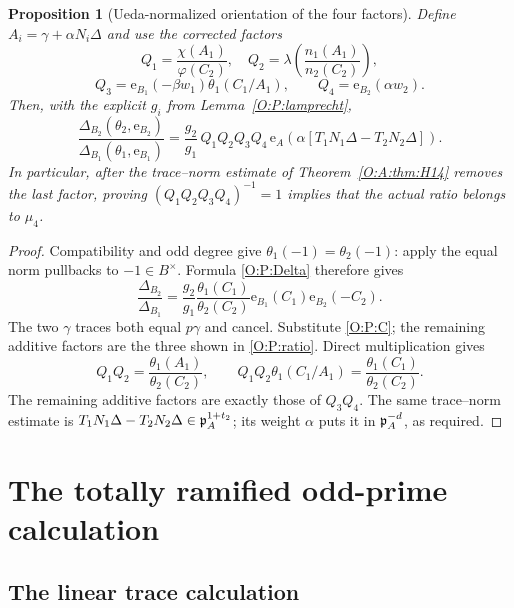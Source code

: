 \documentclass[11pt]{amsart}
\newtheorem{proposition}[theorem]{Proposition}
\theoremstyle{definition}
\theoremstyle{remark}
\newcommand{\ee}{\mathrm e}\newcommand{\echar}{\mathrm e}\newcommand{\FF}{\mathbf F}
\begin{document}
\begin{proposition}[Ueda-normalized orientation of the four factors]
\label{O:P:four}
Define $A_i=\gamma+\alpha N_i\Delta$ and use the corrected factors
\[
 Q_1=\frac{\chi(A_1)}{\varphi(C_2)},\quad
 Q_2=\lambda\left(\frac{n_1(A_1)}{n_2(C_2)}\right),
\]
\[
 Q_3=\ee_{B_1}(-\beta w_1)\theta_1(C_1/A_1),\qquad
 Q_4=\ee_{B_2}(\alpha w_2).
\]
Then, with the explicit $g_i$ from Lemma~\ref{O:P:lamprecht},
\begin{equation}\label{O:P:ratio}
 \frac{\Delta_{B_2}(\theta_2,\ee_{B_2})}
      {\Delta_{B_1}(\theta_1,\ee_{B_1})}
 =\frac{g_2}{g_1}\,Q_1Q_2Q_3Q_4\,
 \ee_A\left(\alpha[T_1N_1\Delta-T_2N_2\Delta]\right).
\end{equation}
In particular, after the trace--norm estimate of Theorem~\ref{O:A:thm:H14}
removes the last factor, proving $(Q_1Q_2Q_3Q_4)^{-1}=1$
implies that the actual ratio belongs to $\mu_4$.
\end{proposition}
\begin{proof}
Compatibility and odd degree give $\theta_1(-1)=\theta_2(-1)$:
apply the equal norm pullbacks to $-1\in B^\times$.
Formula \eqref{O:P:Delta} therefore gives
\[
 \frac{\Delta_{B_2}}{\Delta_{B_1}}
 =\frac{g_2}{g_1}\frac{\theta_1(C_1)}{\theta_2(C_2)}
                      \ee_{B_1}(C_1)\ee_{B_2}(-C_2).
\]
The two $\gamma$ traces both equal $p\gamma$ and cancel.
Substitute \eqref{O:P:C}; the remaining additive factors are the three
shown in \eqref{O:P:ratio}. Direct multiplication gives
\[
 Q_1Q_2=\frac{\theta_1(A_1)}{\theta_2(C_2)},\qquad
 Q_1Q_2\theta_1(C_1/A_1)=\frac{\theta_1(C_1)}{\theta_2(C_2)}.
\]
The remaining additive factors are exactly those of $Q_3Q_4$.
The same trace--norm estimate is
$T_1N_1\Delta-T_2N_2\Delta\in\mathfrak p_A^{1+t_2}$;
its weight $\alpha$ puts it in $\mathfrak p_A^{-d}$, as required.
\end{proof}


\section{The totally ramified odd-prime calculation}\label{sec:odd-calculation}
\subsection{The linear trace calculation}\label{O:sec:linear}
\end{document}
